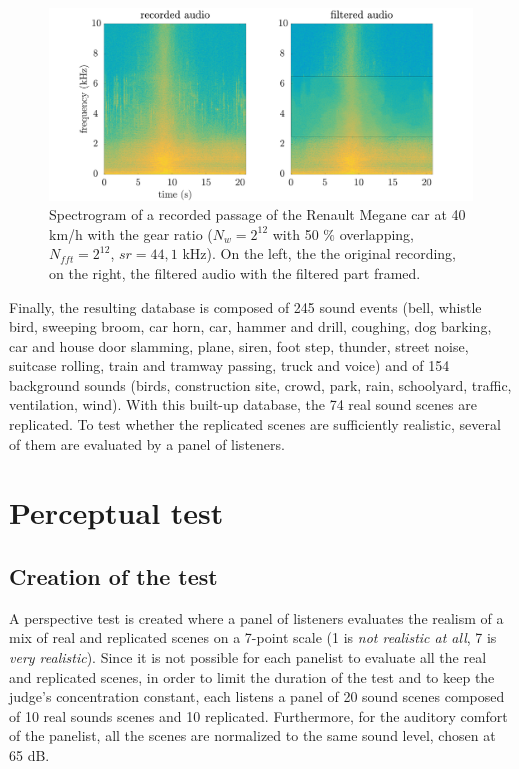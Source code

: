 \documentclass[a4,11pt,twocolumn]{article}
\begin{document}
\begin{figure}[hbtp]
\centering
\includegraphics[width=\linewidth]{./pictures/filtrageMedian_VL1_R3_40_EN.pdf}
\caption{Spectrogram of a recorded passage of the Renault Megane car at 40 km/h with the  gear ratio ($N_{w} = 2^{12}$ with 50 $\%$ overlapping, $N_{fft} = 2^{12}$, $sr = 44,1$ kHz). On the left, the the original recording, on the right, the filtered audio with the filtered part framed.}
\label{fig:filtre_car}
\end{figure}

Finally, the resulting database is composed of 245 sound events (bell, whistle bird, sweeping broom, car horn, car, hammer and drill, coughing, dog barking, car and house door slamming, plane, siren, foot step, thunder, street noise, suitcase rolling, train and tramway passing, truck and voice) and of 154 background sounds (birds, construction site, crowd, park, rain, schoolyard, traffic, ventilation, wind). With this built-up database, the 74 real sound scenes are replicated. To test whether the replicated scenes are sufficiently realistic, several of them are evaluated by a panel of listeners.

\section{Perceptual test} \label{sec:test}
\subsection{Creation of the test}
A perspective test is created where a panel of listeners evaluates the realism of a mix of real and replicated scenes on a 7-point scale (1 is \textit{not realistic at all}, 7 is \textit{very realistic}). Since it is not possible for each panelist to evaluate all the real and replicated scenes, in order to limit the duration of the test and to keep the judge's concentration constant, each listens a panel of 20 sound scenes composed of 10 real sounds scenes and 10 replicated. Furthermore, for the auditory comfort of the panelist, all the scenes are normalized to the same sound level, chosen at 65 dB.\\
\end{document}
